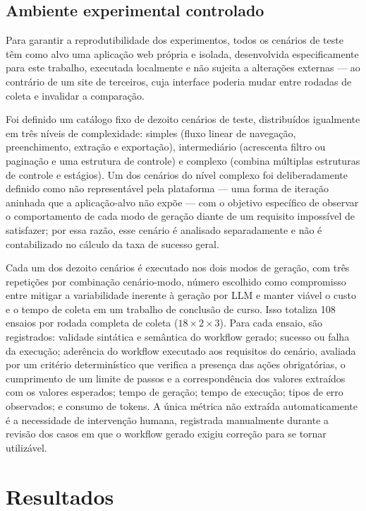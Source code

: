 \documentclass[
	article,
	12pt,
	oneside,
	a4paper,
	section=TITLE,
	english,
	brazil,
	sumario=tradicional
	]{abntex2}
\begin{document}
\subsection{Ambiente experimental controlado}

Para garantir a reprodutibilidade dos experimentos, todos os cenários de
teste têm como alvo uma aplicação web própria e isolada, desenvolvida
especificamente para este trabalho, executada localmente e não sujeita a
alterações externas --- ao contrário de um site de terceiros, cuja
interface poderia mudar entre rodadas de coleta e invalidar a comparação.

Foi definido um catálogo fixo de dezoito cenários de teste, distribuídos
igualmente em três níveis de complexidade: simples (fluxo linear de
navegação, preenchimento, extração e exportação), intermediário
(acrescenta filtro ou paginação e uma estrutura de controle) e complexo
(combina múltiplas estruturas de controle e estágios). Um dos cenários do
nível complexo foi deliberadamente definido como não representável pela
plataforma --- uma forma de iteração aninhada que a aplicação-alvo não
expõe --- com o objetivo específico de observar o comportamento de cada
modo de geração diante de um requisito impossível de satisfazer; por essa
razão, esse cenário é analisado separadamente e não é contabilizado no
cálculo da taxa de sucesso geral.

Cada um dos dezoito cenários é executado nos dois modos de geração, com
três repetições por combinação cenário-modo, número escolhido como
compromisso entre mitigar a variabilidade inerente à geração por LLM e
manter viável o custo e o tempo de coleta em um trabalho de conclusão de
curso. Isso totaliza 108 ensaios por rodada completa de coleta
($18 \times 2 \times 3$). Para cada ensaio, são registrados: validade sintática e semântica
do workflow gerado; sucesso ou falha da execução; aderência do workflow
executado aos requisitos do cenário, avaliada por um critério
determinístico que verifica a presença das ações obrigatórias, o
cumprimento de um limite de passos e a correspondência dos valores
extraídos com os valores esperados; tempo de geração; tempo de execução;
tipos de erro observados; e consumo de tokens. A única métrica não
extraída automaticamente é a necessidade de intervenção humana, registrada
manualmente durante a revisão dos casos em que o workflow gerado exigiu
correção para se tornar utilizável.

\section{Resultados}
\end{document}
